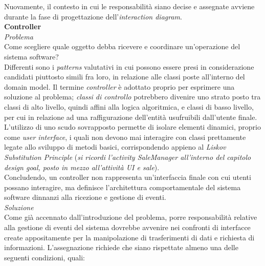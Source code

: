 \documentclass{article}
\begin{document}
Nuovamente, il contesto in cui le responsabilità siano decise e assegnate avviene durante la fase di progettazione dell'\textit{interaction diagram}.\vspace*{14pt}\\
\textbf{Controller}\vspace*{7pt}\\
\textit{Problema}\\
Come scegliere quale oggetto debba ricevere e coordinare un'operazione del sistema software?\vspace*{7pt}\\
Differenti sono i \textit{patterns} valutativi in cui possono essere presi in considerazione candidati piuttosto simili fra loro, in relazione alle classi poste all'interno del domain model. Il termine \textit{controller} è adottato proprio per esprimere una soluzione al problema; \textit{classi di controllo} potrebbero divenire uno strato posto tra classi di alto livello, quindi affini alla logica algoritmica, e classi di basso livello, per cui in relazione ad una raffigurazione dell'entità usufruibili dall'utente finale. L'utilizzo di uno scudo sovrapposto permette di isolare elementi dinamici, proprio come \textit{user interface}, i quali non devono mai interagire con classi prettamente legate allo sviluppo di metodi basici, corrispondendo appieno al \textit{Liskov Substitution Principle} (\textit{si ricordi l'activity SaleManager all'interno del capitolo design goal, posto in mezzo all'attività UI e sale}).\vspace*{14pt}\\
Concludendo, un controller non rappresenta un'interfaccia finale con cui utenti possano interagire, ma definisce l'architettura comportamentale del sistema software dinnanzi alla ricezione e gestione di eventi.\vspace*{14pt}\\
\textit{Soluzione}\\
Come già accennato dall'introduzione del problema, porre responsabilità relative alla gestione di eventi del sistema dovrebbe avvenire nei confronti di interfacce create appositamente per la manipolazione di trasferimenti di dati e richiesta di informazioni. L'assegnazione richiede che siano rispettate almeno una delle seguenti condizioni, quali:
\end{document}
